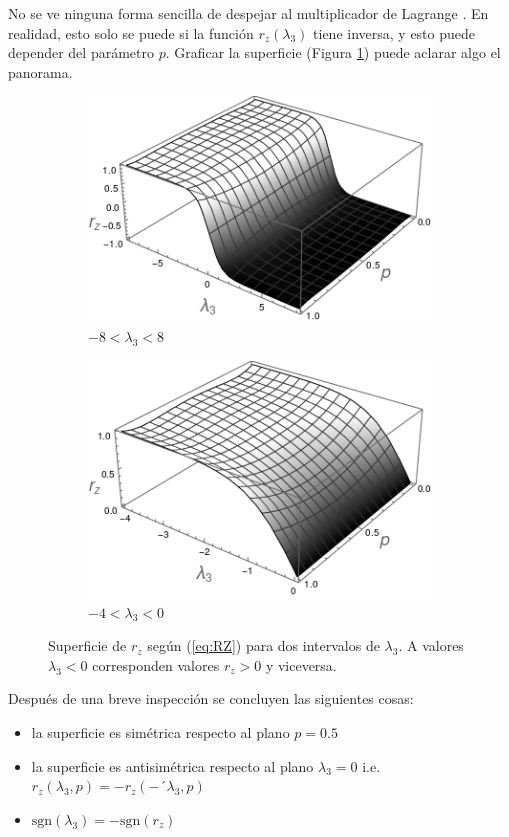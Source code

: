 No se ve ninguna forma sencilla de despejar al multiplicador de Lagrange . En realidad, esto solo se puede si la función $r_{z}(\lambda_{3})$ tiene inversa, y esto puede depender del parámetro $p$. Graficar la superficie (Figura \ref{fig:rzsurf}) puede aclarar algo el panorama.
\begin{figure}[h!]
\centering
\begin{subfigure}{0.475\textwidth}
  \centering
  \includegraphics[width=0.6\linewidth]{maxent/figures/LagrangeMult_lambda-8to8.png}
  \caption{$-8<\lambda_{3}<8$}
\end{subfigure}%
\begin{subfigure}{0.475\textwidth}
  \centering
  \includegraphics[width=0.6\linewidth]{maxent/figures/LagrangeMult_lambda-4to0.png}
  \caption{$-4<\lambda_{3}<0$}
\end{subfigure}
\caption{Superficie de $r_{z}$ según (\ref{eq:RZ}) para dos intervalos de $\lambda_{3}$. A valores $\lambda_{3}<0$ corresponden valores $r_{z}>0$ y viceversa.}
\label{fig:rzsurf}
\end{figure}

Después de una breve inspección se concluyen las siguientes cosas:
\begin{itemize}
\item la superficie es simétrica respecto al plano $p=0.5$
\item la superficie es antisimétrica  respecto al plano $\lambda_{3}=0$ i.e. $r_{z
}(\lambda_{3},p)=-r_{z
}(-´\lambda_{3},p)$
\item $\text{sgn}(\lambda_{3})=-\text{sgn}(r_{z})$
\end{itemize}

